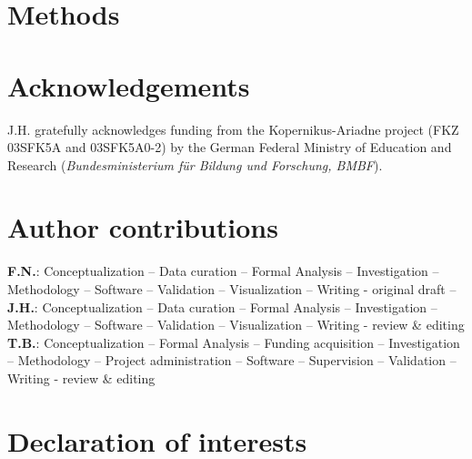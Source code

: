 \documentclass[1p,11pt]{elsarticle}
\begin{document}


\section*{Methods}

\label{sec:methods}



\section*{Acknowledgements}

J.H. gratefully acknowledges funding from the Kopernikus-Ariadne project (FKZ
03SFK5A and 03SFK5A0-2) by the German Federal Ministry of Education and
Research (\textit{Bundesministerium für Bildung und Forschung, BMBF}).


\section*{Author contributions}


\textbf{F.N.}:
Conceptualization --
Data curation --
Formal Analysis --
Investigation --
Methodology --
Software --
Validation --
Visualization --
Writing - original draft --
\textbf{J.H.}:
Conceptualization --
Data curation --
Formal Analysis --
Investigation --
Methodology --
Software --
Validation --
Visualization --
Writing - review \& editing
\textbf{T.B.}:
Conceptualization --
Formal Analysis --
Funding acquisition --
Investigation --
Methodology --
Project administration --
Software --
Supervision --
Validation --
Writing - review \& editing

\section*{Declaration of interests}
\end{document}
